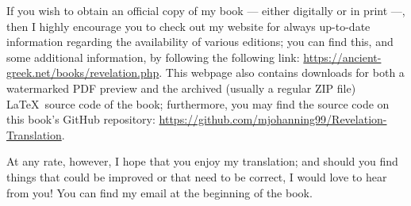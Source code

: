 If you wish to obtain an official copy of my book — either digitally or in print —, then I highly encourage you to check out my website for always up-to-date information regarding the availability of various editions; you can find this, and some additional information, by following the following link: \url{https://ancient-greek.net/books/revelation.php}. This webpage also contains downloads for both a watermarked PDF preview and the archived (usually a regular ZIP file) \LaTeX\ source code of the book; furthermore, you may find the source code on this book’s GitHub repository: \url{https://github.com/mjohanning99/Revelation-Translation}.

At any rate, however, I hope that you enjoy my translation; and should you find things that could be improved or that need to be correct, I would love to hear from you! You can find my email at the beginning of the book. 